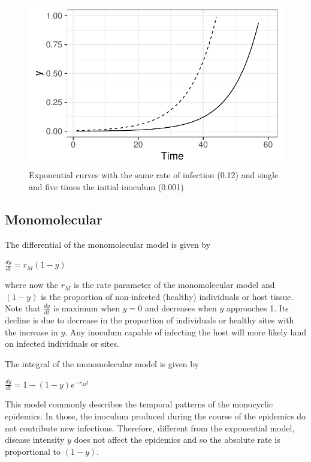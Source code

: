 \documentclass[
  letterpaper,
  DIV=11,
  numbers=noendperiod]{scrreprt}
\begin{document}
\begin{figure}[H]

{\centering \includegraphics{temporal-models_files/figure-pdf/fig-exp2-1.pdf}

}

\caption{\label{fig-exp2}Exponential curves with the same rate of
infection (0.12) and single and five times the initial inoculum (0.001)}

\end{figure}

\hypertarget{monomolecular}{%
\subsection{Monomolecular}\label{monomolecular}}

The differential of the monomolecular model is given by

\(\frac{dy}{dt} = r_M (1-y)\)

where now the \(r_M\) is the rate parameter of the monomolecular model
and \((1-y)\) is the proportion of non-infected (healthy) individuals or
host tissue. Note that \(\frac{dy}{dt}\) is maximum when \(y = 0\) and
decreases when \(y\) approaches 1. Its decline is due to decrease in the
proportion of individuals or healthy sites with the increase in \(y\).
Any inoculum capable of infecting the host will more likely land on
infected individuals or sites.

The integral of the monomolecular model is given by

\(\frac{dy}{dt} = 1 - (1-y)e^{-r_Mt}\)

This model commonly describes the temporal patterns of the monocyclic
epidemics. In those, the inoculum produced during the course of the
epidemics do not contribute new infections. Therefore, different from
the exponential model, disease intensity \(y\) does not affect the
epidemics and so the absolute rate is proportional to \((1-y)\).
\end{document}
